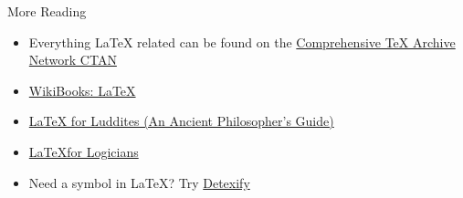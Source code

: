 \begin{frame}{More Reading}

\begin{itemize}
\item Everything \LaTeX{} related can be found on the
  \href{http://www.ctan.org/}{Comprehensive \TeX{} Archive Network
    CTAN}
\item \href{http://en.wikibooks.org/wiki/LaTeX}{WikiBooks: \LaTeX}
\item
  \href{http://individual.utoronto.ca/williecostello/latex.html}{\LaTeX{}
    for Luddites (An Ancient Philosopher's Guide)}
\item
  \href{http://www.logicmatters.net/latex-for-logicians/}{\LaTeX{}for
    Logicians}
\item Need a symbol in \LaTeX? Try
  \href{http://detexify.kirelabs.org/classify.html}{Detexify}
\end{itemize}

\end{frame}


